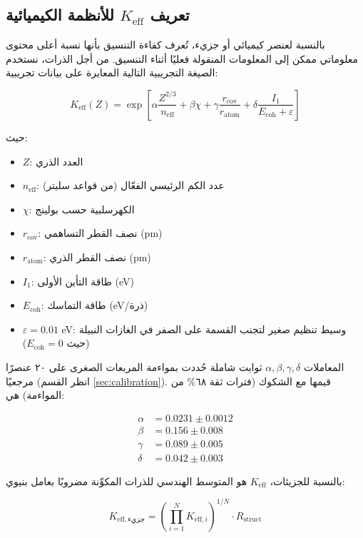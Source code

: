 \documentclass[12pt,a4paper]{article}
\theoremstyle{remark}
\newcommand{\Keff}{K_{\mathrm{eff}}}
\newcommand{\Rstruct}{R_{\mathrm{struct}}}
\begin{document}
	\subsection{تعريف $\Keff$ للأنظمة الكيميائية}
	
	بالنسبة لعنصر كيميائي أو جزيء، تُعرف كفاءة التنسيق بأنها نسبة أعلى محتوى معلوماتي ممكن إلى المعلومات المنقولة فعليًا أثناء التنسيق. من أجل الذرات، نستخدم الصيغة التجريبية التالية المعايرة على بيانات تجريبية:
	
	\begin{equation}
		\Keff(Z) = \exp\left[\alpha \frac{Z^{2/3}}{n_{\text{eff}}} + \beta \chi + \gamma \frac{r_{\text{cov}}}{r_{\text{atom}}} + \delta \frac{I_1}{E_{\text{coh}} + \varepsilon}\right]
		\label{eq:keff-element}
	\end{equation}
	
	حيث:
	\begin{itemize}
		\item $Z$: العدد الذري
		\item $n_{\text{eff}}$: عدد الكم الرئيسي الفعّال (من قواعد سليتر)
		\item $\chi$: الكهرسلبية حسب بولينج
		\item $r_{\text{cov}}$: نصف القطر التساهمي (pm)
		\item $r_{\text{atom}}$: نصف القطر الذري (pm)
		\item $I_1$: طاقة التأين الأولى (eV)
		\item $E_{\text{coh}}$: طاقة التماسك (eV/ذرة)
		\item $\varepsilon = 0.01$ eV: وسيط تنظيم صغير لتجنب القسمة على الصفر في الغازات النبيلة (حيث $E_{\text{coh}} = 0$)
	\end{itemize}
	
	المعاملات $\alpha, \beta, \gamma, \delta$ ثوابت شاملة حُددت بمواءمة المربعات الصغرى على ٢٠ عنصرًا مرجعيًا (انظر القسم \ref{sec:calibration}). قيمها مع الشكوك (فترات ثقة ٦٨\% من المواءمة) هي:
	
	\begin{align}
		\alpha &= 0.0231 \pm 0.0012 \\
		\beta &= 0.156 \pm 0.008 \\
		\gamma &= 0.089 \pm 0.005 \\
		\delta &= 0.042 \pm 0.003
	\end{align}
	
	بالنسبة للجزيئات، $\Keff$ هو المتوسط الهندسي للذرات المكوِّنة مضروبًا بعامل بنيوي:
	
	\begin{equation}
		K_{\mathrm{eff},\text{جزيء}} = \left(\prod_{i=1}^{N} K_{\mathrm{eff},i}\right)^{1/N} \cdot \Rstruct
		\label{eq:keff-molecule}
	\end{equation}
	
\end{document}

